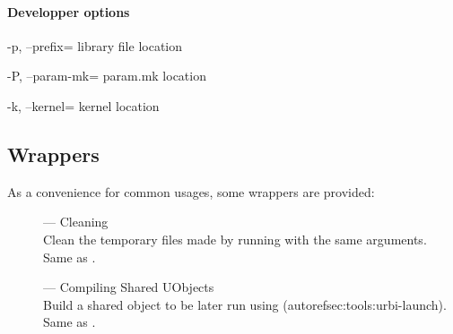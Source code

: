 \paragraph{Developper options}
\begin{options}
\item[-p, --prefix=\var{dir}] library file location
\item[-P, --param-mk=\var{file}] param.mk location
\item[-k, --kernel=\var{dir}] kernel location
\end{options}


\subsection{ Wrappers}
\label{sec:tools:umake:wrappers}

As a convenience for common  usages, some wrappers are
provided:
\begin{description}
\item[] --- Cleaning\\
  Clean the temporary files made by running  with the
  same arguments.  Same as .
\item[] --- Compiling Shared UObjects\\
  Build a shared object to be later run using 
  (autoref{sec:tools:urbi-launch}).  Same as .
\end{description}

